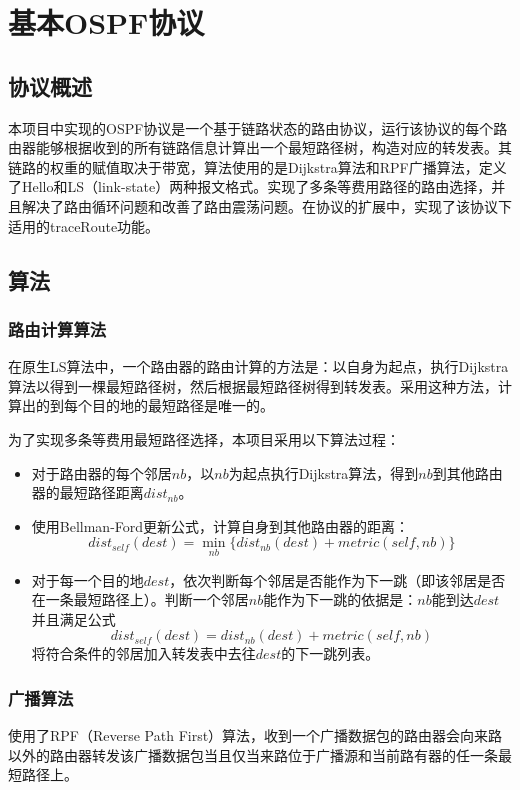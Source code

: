 \section{基本OSPF协议} %
\label{sec:ospf}
\subsection{协议概述} %
\label{sub:协议概述}
本项目中实现的OSPF协议是一个基于链路状态的路由协议，运行该协议的每个路由器能够根据收到的所有链路信息计算出一个最短路径树，构造对应的转发表。其链路的权重的赋值取决于带宽，算法使用的是Dijkstra算法和RPF广播算法，定义了Hello和LS（link-state）两种报文格式。实现了多条等费用路径的路由选择，并且解决了路由循环问题和改善了路由震荡问题。在协议的扩展中，实现了该协议下适用的traceRoute功能。
\subsection{算法} %
\label{sub:算法}
\subsubsection{路由计算算法} %
\label{ssub:路由计算算法}
在原生LS算法中，一个路由器的路由计算的方法是：以自身为起点，执行Dijkstra算法以得到一棵最短路径树，然后根据最短路径树得到转发表。采用这种方法，计算出的到每个目的地的最短路径是唯一的。
\par 为了实现多条等费用最短路径选择，本项目采用以下算法过程：
\begin{itemize}
	\item 对于路由器的每个邻居$nb$，以$nb$为起点执行Dijkstra算法，得到$nb$到其他路由器的最短路径距离$dist_{nb}$。
	\item 使用Bellman-Ford更新公式，计算自身到其他路由器的距离：$$dist_{self}(dest) = \min_{nb}\{dist_{nb}(dest) + metric(self,nb)\} $$
	\item 对于每一个目的地$dest$，依次判断每个邻居是否能作为下一跳（即该邻居是否在一条最短路径上）。判断一个邻居$nb$能作为下一跳的依据是：$nb$能到达$dest$并且满足公式$$dist_{self}(dest) = dist_{nb}(dest) + metric(self,nb)$$将符合条件的邻居加入转发表中去往$dest$的下一跳列表。
\end{itemize}
\subsubsection{广播算法} %
\label{ssub:广播算法}
使用了RPF（Reverse Path First）算法，收到一个广播数据包的路由器会向来路以外的路由器转发该广播数据包当且仅当来路位于广播源和当前路有器的任一条最短路径上。
